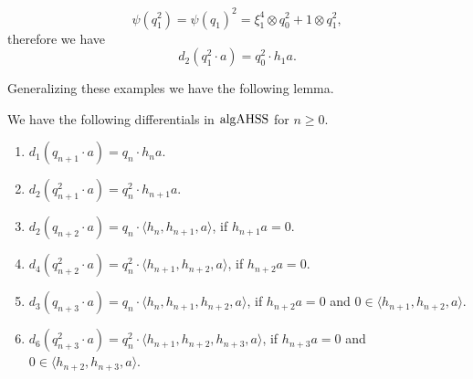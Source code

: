 \begin{exm}
  $$\psi(q_1^2) = \psi(q_1)^2 = \xi_1^4 \otimes q_0^2 + 1 \otimes q_1^2,$$
  therefore we have
  $$d_2 (q_1^2\cdot a) =  q_0^2 \cdot h_1 a.$$
\end{exm}

Generalizing these examples we have the following lemma.

\begin{lem} \label{lem AH diff}
We have the following differentials in $\textup{algAHSS}$ for $n \geq 0$.
\begin{enumerate}
\item $d_1 (q_{n+1} \cdot a) = q_n \cdot h_n a$.
\item $d_2 (q_{n+1}^2 \cdot a) = q_n^2 \cdot h_{n+1} a$.
\item $d_2 (q_{n+2} \cdot a) = q_{n} \cdot  \langle h_n, h_{n+1}, a \rangle$, if $h_{n+1}a = 0$.
\item $d_4 (q_{n+2}^2 \cdot a) = q_{n}^2 \cdot  \langle h_{n+1}, h_{n+2}, a \rangle$, if $h_{n+2}a = 0$.
\item $d_3 (q_{n+3} \cdot a) = q_{n} \cdot  \langle h_n, h_{n+1}, h_{n+2}, a \rangle$, if $h_{n+2}a = 0$ and $0\in\langle h_{n+1}, h_{n+2}, a \rangle$.
\item $d_6 (q_{n+3}^2 \cdot a) = q_{n}^2 \cdot  \langle h_{n+1}, h_{n+2}, h_{n+3}, a \rangle$, if $h_{n+3}a = 0$ and $0\in\langle h_{n+2}, h_{n+3}, a \rangle$.
\end{enumerate}
\end{lem}

